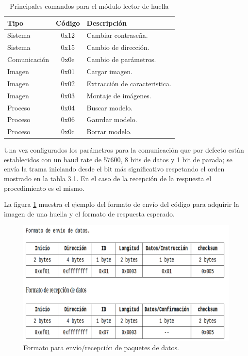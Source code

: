 \begin{table}[h]
	\centering
	\caption[caption corto]{Principales comandos para el módulo lector de huella}
	\begin{tabular}{l c l}    
		\toprule
		\textbf{Tipo}  & \textbf{Código}  & \textbf{Descripción}\\
		\midrule
		Sistema	 	& 0x12 	& Cambiar contraseña.\\		
		Sistema	 	& 0x15 	& Cambio de dirección.\\
		Comunicación & 0x0e & Cambio de parámetros.\\	
		Imagen	 	& 0x01 	& Cargar imagen.\\
		Imagen	 	& 0x02 	& Extracción de caracteristica.\\
		Imagen	 	& 0x03 	& Montaje de imágenes.\\
		Proceso	 	& 0x04 	& Buscar modelo.\\
		Proceso	 	& 0x06 	& Gaurdar modelo.\\				
		Proceso	 	& 0x0c 	& Borrar  modelo.\\				
		\bottomrule
		\hline
	\end{tabular}
	\label{tab:comandos}
\end{table}

Una vez configurados los parámetros para la comunicación que por defecto están establecidos con un baud rate de 57600, 8 bits de datos y 1 bit de parada; se envía la trama iniciando desde el bit más significativo respetando el orden mostrado en la tabla 3.1.
En el caso de la recepción de la respuesta el procedimiento es el mismo.

La figura \ref{fig:tablasensor} muestra el ejemplo del formato de envío del código para adquirir la imagen de una huella y el formato de respuesta esperado.

\begin{figure}[h]
	\centering
	\includegraphics[scale=.3]{./Figures/tablasensor.png}
	\caption{Formato para envío/recepción de paquetes de datos.}
	\label{fig:tablasensor}
\end{figure}


